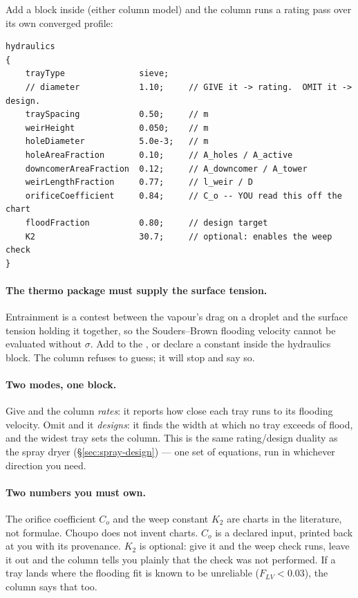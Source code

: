 \documentclass[11pt,a4paper]{article}
\begin{document}
Add a  block inside  (either
column model) and the column runs a rating pass over its own converged
profile:

\begin{lstlisting}[language=dict]
hydraulics
{
    trayType               sieve;
    // diameter            1.10;     // GIVE it -> rating.  OMIT it -> design.
    traySpacing            0.50;     // m
    weirHeight             0.050;    // m
    holeDiameter           5.0e-3;   // m
    holeAreaFraction       0.10;     // A_holes / A_active
    downcomerAreaFraction  0.12;     // A_downcomer / A_tower
    weirLengthFraction     0.77;     // l_weir / D
    orificeCoefficient     0.84;     // C_o -- YOU read this off the chart
    floodFraction          0.80;     // design target
    K2                     30.7;     // optional: enables the weep check
}
\end{lstlisting}

\paragraph{The thermo package must supply the surface tension.}
Entrainment is a contest between the vapour's drag on a droplet and the
surface tension holding it together, so the Souders--Brown flooding
velocity cannot be evaluated without $\sigma$.  Add
 to the
, or declare a constant  inside
the hydraulics block.  The column refuses to guess; it will stop and
say so.

\paragraph{Two modes, one block.}  Give  and the column
\emph{rates}: it reports how close each tray runs to its flooding
velocity.  Omit  and it \emph{designs}: it finds the
width at which no tray exceeds  of flood, and the
widest tray sets the column.  This is the same rating/design duality as
the spray dryer (\S\ref{sec:spray-design}) --- one set of equations, run
in whichever direction you need.

\paragraph{Two numbers you must own.}  The orifice coefficient $C_o$
and the weep constant $K_2$ are charts in the literature, not formulae.
Choupo does not invent charts.  $C_o$ is a declared input, printed back
at you with its provenance.  $K_2$ is optional: give it and the weep
check runs, leave it out and the column tells you plainly that the
check was not performed.  If a tray lands where the flooding fit is
known to be unreliable ($F_{LV} < 0.03$), the column says that too.
\end{document}
